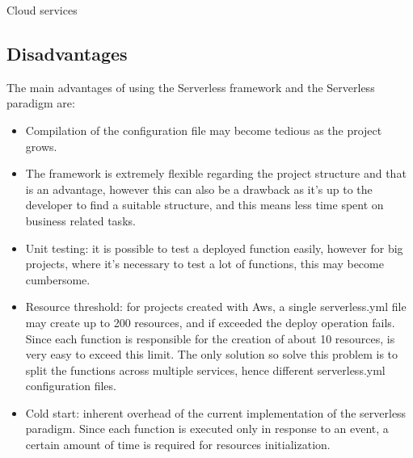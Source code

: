 \begin{chapter}{Cloud services}
    \subsection{Disadvantages}
    \label{subsec:sls_disadvantage}
    The main advantages of using the Serverless framework and the Serverless paradigm are:
    \begin{itemize}
        \item Compilation of the configuration file may become tedious as the project grows.
        \item The framework is extremely flexible regarding the project structure and
            that is an advantage, however this can also be a drawback as it's up to the
            developer to find a suitable structure, and this means less time spent on
            business related tasks.
        \item Unit testing: it is possible to test a deployed function easily, however
            for big projects, where it's necessary to test a lot of functions, this may
            become cumbersome.
        \item Resource threshold: for projects created with Aws, a single
            serverless.yml file may create up to 200 resources, and if exceeded
            the deploy operation fails. Since each function is responsible for the
            creation of about 10 resources, is very easy to exceed this limit.
            The only solution so solve this problem is to split the functions across
            multiple services, hence different serverless.yml configuration files.
        \item Cold start: inherent overhead of the current implementation of the
            serverless paradigm. Since each function is executed only in response to
            an event, a certain amount of time is required for resources initialization.
    \end{itemize}


\end{chapter}
